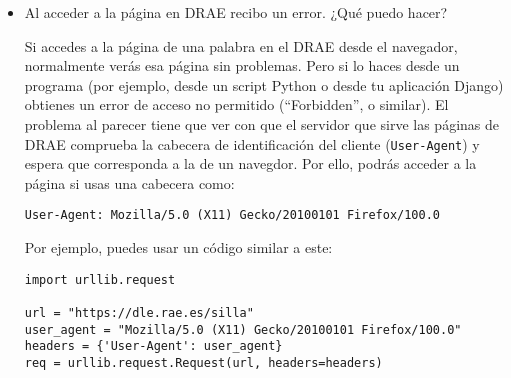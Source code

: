 \begin{itemize}
  El despliegue puede realizarse en cualquier ordenador que esté conectado permanentemente a Internet durante el periodo de corrección, en una dirección accesible desde cualquier navegador conectado a su vez a Internet. Esto puede ser por ejemplo un ordenador personal en un domicilio con acceso permanente a Internet, adecuadamente configurado (puede ser una Raspberry Pi o similar, si se busca una solución simple y de bajo coste). También puede ser un servicio en Internet, por ejemplo uno gratuito como los que ofrecen Google (instrucciones\footnote{GCP Quickstart Using a Linux VM:\\ \url{https://cloud.google.com/compute/docs/quickstart-linux}}, precios\footnote{Google Compute Engine Pricing:\\ \url{https://cloud.google.com/compute/pricing}}), o PythonAnywhere (instrucciones\footnote{Capítulo ``Deploy!'' de Django Girls Tutorial:\\ \url{https://tutorial.djangogirls.org/en/deploy/}}, precios\footnote{PythonAnywhere Plans and Pricing:\\ \url{https://www.pythonanywhere.com/pricing/}}). Los profesores podremos ayudar de forma más detallada con PythonAnywhere.

\item Al acceder a la página en DRAE recibo un error. ¿Qué puedo hacer?

  Si accedes a la página de una palabra en el DRAE desde el navegador, normalmente verás esa página sin problemas. Pero si lo haces desde un programa (por ejemplo, desde un script Python o desde tu aplicación Django) obtienes un error de acceso no permitido (``Forbidden'', o similar). El problema al parecer tiene que ver con que el servidor que sirve las páginas de DRAE comprueba la cabecera de identificación del cliente (\texttt{User-Agent}) y espera que corresponda a la de un navegdor. Por ello, podrás acceder a la página si usas una cabecera como:

\begin{verbatim}
User-Agent: Mozilla/5.0 (X11) Gecko/20100101 Firefox/100.0
\end{verbatim}

  Por ejemplo, puedes usar un código similar a este:

\begin{verbatim}
import urllib.request

url = "https://dle.rae.es/silla"
user_agent = "Mozilla/5.0 (X11) Gecko/20100101 Firefox/100.0"
headers = {'User-Agent': user_agent}
req = urllib.request.Request(url, headers=headers)


\end{verbatim}
\end{itemize}
